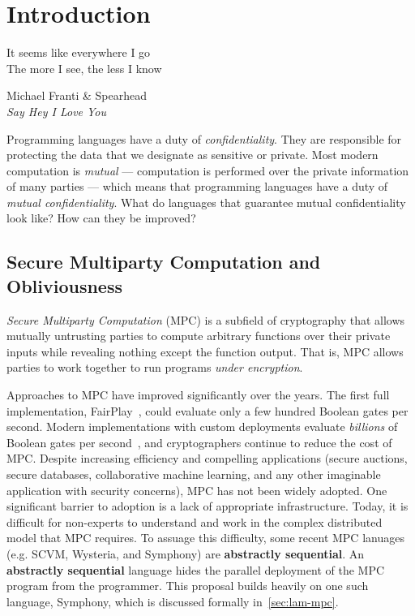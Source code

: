 \chapter{Introduction}
\label{ch:intro}

\epigraph{It seems like everywhere I go \\
          The more I see, the less I know}{
            Michael Franti \& Spearhead \\
            \emph{Say Hey I Love You}}

Programming languages have a duty of \emph{confidentiality}. They are responsible for protecting the
data that we designate as sensitive or private. Most modern computation is \emph{mutual} --- computation
is performed over the private information of many parties --- which means that programming languages
have a duty of \emph{mutual confidentiality}. What do languages that guarantee mutual confidentiality look
like? How can they be improved?

\section{Secure Multiparty Computation and Obliviousness}
\label{sec:intro-mpc-obliv}

\emph{Secure Multiparty Computation} (MPC) is a subfield of cryptography
that allows mutually untrusting parties to compute arbitrary functions over their private inputs while revealing nothing
except the function output. That is, MPC allows parties to work together to run programs \emph{under encryption}.

Approaches to MPC have improved significantly over the years. The first full implementation, FairPlay~\cite{todo}, could evaluate
only a few hundred Boolean gates per second. Modern implementations with custom deployments evaluate \emph{billions} of Boolean gates per
second~\cite{todo}, and cryptographers continue to reduce the cost of MPC. Despite increasing efficiency and compelling applications
(secure auctions, secure databases, collaborative machine learning, and any other imaginable application with security concerns),
MPC has not been widely adopted. One significant barrier to adoption is a lack of appropriate infrastructure. Today, it is difficult
for non-experts to understand and work in the complex distributed model that MPC requires. To assuage this difficulty, some recent
MPC lanuages (e.g. SCVM, Wysteria, and Symphony) are \textbf{abstractly sequential}. An \textbf{abstractly sequential} language hides
the parallel deployment of the MPC program from the programmer. This proposal builds heavily on one such language, Symphony, which is
discussed formally in~\cref{sec:lam-mpc}.

